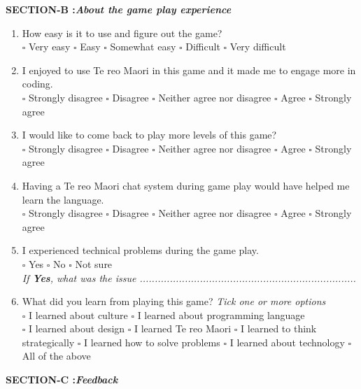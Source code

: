 \documentclass[12pt]{article}\pagestyle{myheadings}
\theoremstyle{plain}
\begin{document}
\textbf{ SECTION-B :\textit{About the game play experience}}
\begin{mdframed}
\begin{enumerate}

\item  How easy is it to use and figure out the game?\\
$\square$ Very easy $\square$ Easy $\square$ Somewhat easy $\square$ Difficult $\square$ Very difficult

\item I enjoyed to use Te reo Maori in this game and it made me to engage more in coding. \\
$\square$ Strongly disagree $\square$ Disagree $\square$ Neither agree nor disagree $\square$ Agree $\square$ Strongly agree



\item I would like to come back to play more levels of this game?\\ 
$\square$ Strongly disagree $\square$ Disagree $\square$ Neither agree nor disagree $\square$ Agree $\square$ Strongly agree

\item Having a Te reo Maori chat system during game play would have helped me learn the language.\\ 
$\square$ Strongly disagree $\square$ Disagree $\square$ Neither agree nor disagree $\square$ Agree $\square$ Strongly agree

\item I experienced technical problems during the game play.\\
$\square$ Yes $\square$ No $\square$ Not sure\\
\textit{ If \textbf{Yes}, what was the issue ........................................................................}

 
\item What did you learn from playing this game? \textit{Tick one or more options}\\
$\square$  I learned about culture $\square$  I learned about programming language \\$\square$ I learned about design $\square$ I learned Te reo Maori $\square$ I learned to think strategically $\square$ I learned how to solve problems $\square$ I learned about technology
$\square$ All of the above

\end{enumerate}
\end{mdframed}
\textbf{ SECTION-C :\textit{Feedback}}
\end{document}
